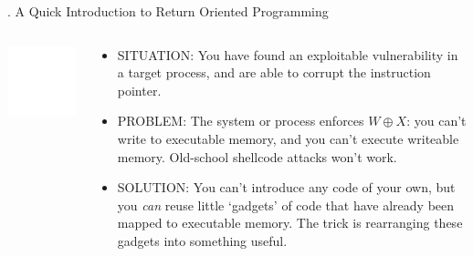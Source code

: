 \documentclass[9pt]{beamer}
\begin{document}
\begin{frame}{\theframenumber. A Quick Introduction to Return Oriented Programming}
  \begin{columns}
    \begin{column}{.4\textwidth}
      \includegraphics[width=\textwidth]{../images/macgyver-transparent.png}
    \end{column}
    \begin{column}{.6\textwidth}
      \begin{itemize}
      \item SITUATION: You have found an exploitable vulnerability in a target process, and are able to corrupt the instruction pointer.
        \item PROBLEM: The system or process enforces $W\oplus X$: you can't write to executable memory, and you can't execute writeable memory. Old-school shellcode attacks won't work. 
        \item SOLUTION: You can't introduce any code of your own, but you \emph{can} reuse little `gadgets' of code that have already been mapped to executable memory. The trick is rearranging these gadgets into something useful.
      \end{itemize}
    \end{column}
    \end{columns}
\end{frame}
\end{document}

